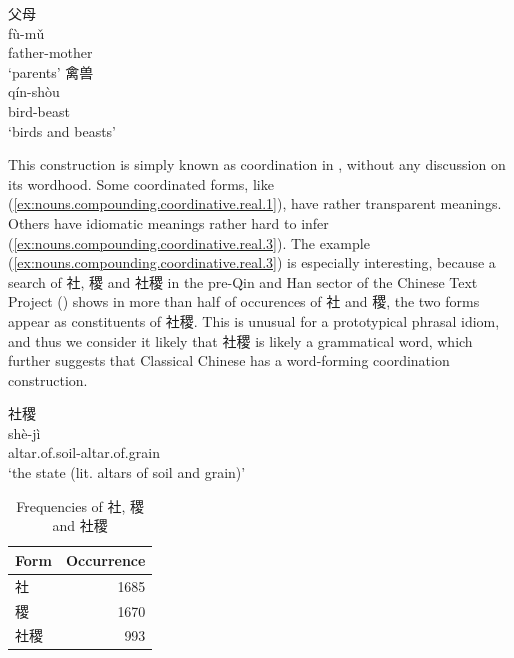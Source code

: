 \documentclass[UTF8, a4paper, oneside, scheme=plain, 12pt]{ctexrep}
\newcommand*{\citepage}[1]{p.~{#1}}
\newcommand{\translate}[1]{`#1'}
\begin{document}
\begin{exe}
    \ex\label{ex:nouns.compounding.coordinative.real.1}
    \glll 父母 \\
    fù-mǔ \\
    father-mother \\
    \glt\translate{parents}
    \ex\label{ex:nouns.compounding.coordinative.real.2}
    \glll 禽兽 \\
    qín-shòu \\
    bird-beast \\
    \glt\translate{birds and beasts}
\end{exe}

This construction is simply known as coordination in \citet[\citepage{61}]{pulleyblank1995outline}, without any discussion on its wordhood.
Some coordinated forms, like (\ref{ex:nouns.compounding.coordinative.real.1}), have rather transparent meanings.
Others have idiomatic meanings rather hard to infer (\ref{ex:nouns.compounding.coordinative.real.3}).
The example (\ref{ex:nouns.compounding.coordinative.real.3}) is especially interesting,
because a search of 社, 稷 and 社稷 in the pre-Qin and Han sector of the Chinese Text Project ()
shows in more than half of occurences of 社 and 稷, the two forms appear as constituents of 社稷.
This is unusual for a prototypical phrasal idiom,
and thus we consider it likely that 社稷 is likely a grammatical word,
which further suggests that Classical Chinese has a word-forming coordination construction.

\begin{exe}
    \ex\label{ex:nouns.compounding.coordinative.real.3}
    \glll 社稷 \\
    shè-jì \\
    altar.of.soil-altar.of.grain \\
    \glt\translate{the state (lit. altars of soil and grain)}
\end{exe}

\begin{table}[H]
    \caption{Frequencies of 社, 稷 and 社稷}
    \label{tbl:sheji-frequency}
    \centering
    \begin{tabular}{lr}
        \toprule
        Form & Occurrence \\
        \midrule
        社 & 1685 \\
        稷 & 1670 \\
        社稷 & 993 \\
        \bottomrule
    \end{tabular}
\end{table}
\end{document}
